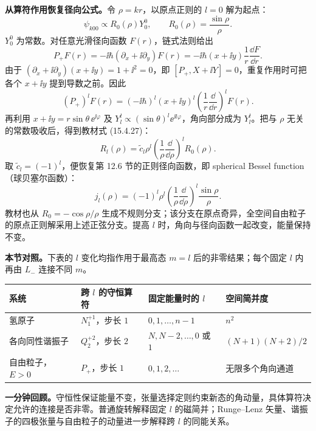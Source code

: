 \textbf{从算符作用恢复径向公式。}令 $\rho=kr$，以原点正则的 $l=0$ 解为起点：
\begin{equation}
  \psi_{k00}\propto R_0(\rho)Y_0^0,\qquad
  R_0(\rho)=\frac{\sin\rho}{\rho}.
\end{equation}
$Y_0^0$ 为常数。对任意光滑径向函数 $F(r)$，链式法则给出
\begin{equation}
  P_+F(r)=-\ii\hbar(\partial_x+\ii\partial_y)F(r)
    =-\ii\hbar(x+\ii y)\frac1r\frac{\dd F}{\dd r}.
\end{equation}
由于 $(\partial_x+\ii\partial_y)(x+\ii y)=1+\ii^2=0$，即 $[P_+,X+\ii Y]=0$，重复作用时可把各个 $x+\ii y$ 提到导数之前。因此
\begin{equation}
  \boxed{(P_+)^lF(r)=(-\ii\hbar)^l(x+\ii y)^l
    \left(\frac1r\frac\dd{\dd r}\right)^lF(r).}
\end{equation}
再利用 $x+\ii y=r\sin\theta\,\ee^{\ii\varphi}$ 及
$Y_l^l\propto(\sin\theta)^l\ee^{\ii l\varphi}$，角向部分成为 $Y_l^l$。把与 $\rho$ 无关的常数吸收后，得到教材式 (15.4.27)：
\begin{equation}
  R_l(\rho)=\widetilde c_l\rho^l
    \left(\frac1\rho\frac\dd{\dd\rho}\right)^lR_0(\rho).
\end{equation}
取 $\widetilde c_l=(-1)^l$，便恢复第 12.6 节的正则径向函数，即 spherical Bessel function（球贝塞尔函数）：
\begin{equation}
  \boxed{j_l(\rho)=(-1)^l\rho^l
    \left(\frac1\rho\frac\dd{\dd\rho}\right)^l\frac{\sin\rho}{\rho}.}
\end{equation}
教材也从 $R_0=-\cos\rho/\rho$ 生成不规则分支；该分支在原点奇异，全空间自由粒子的原点正则解采用上述正弦分支。提高 $l$ 时，角向与径向函数一起改变，能量保持不变。

\textbf{本节对照。}下表的 $l$ 变化均指作用于最高态 $m=l$ 后的非零结果；每个固定 $l$ 内再由 $L_-$ 连接不同 $m$。
\begin{center}
\begin{tabularx}{\textwidth}{@{}lXXX@{}}
  \toprule
  系统 & 跨 $l$ 的守恒算符 & 固定能量时的 $l$ & 空间简并度 \\
  \midrule
  氢原子 & $N_1^{+1}$，步长 $1$ & $0,1,\ldots,n-1$ & $n^2$ \\
  各向同性谐振子 & $Q_2^{+2}$，步长 $2$ & $N,N-2,\ldots,0$ 或 $1$ & $(N+1)(N+2)/2$ \\
  自由粒子，$E>0$ & $P_+$，步长 $1$ & $0,1,2,\ldots$ & 无限多个角向通道 \\
  \bottomrule
\end{tabularx}
\end{center}
\textbf{一分钟回顾。}守恒性保证能量不变，张量选择定则约束新态的角动量，具体算符决定允许的连接是否非零。普通旋转解释固定 $l$ 的磁简并；Runge--Lenz 矢量、谐振子的四极张量与自由粒子的动量进一步解释跨 $l$ 的同能关系。
